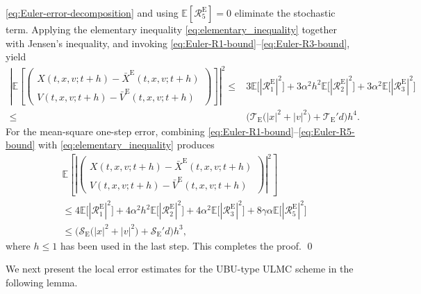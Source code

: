 \documentclass[12pt]{article}
\newenvironment{redtext}
  {\color{black}\ignorespaces}
  {\ignorespacesafterend}
\numberwithin{equation}{section}
\renewenvironment{proof}%
  {\begin{trivlist}%
   \item[]\ignorespaces}%
  {\qed\end{trivlist}}
\newcommand{\E}{\mathbb{E}}
\begin{document}
\begin{redtext}
\begin{proof}
\eqref{eq:Euler-error-decomposition} and using
$\E[\mathcal R_5^{\mathrm E}]=0$ eliminate the stochastic term.
Applying the elementary inequality
\eqref{eq:elementary_inequality} together with Jensen's inequality,
and invoking
\eqref{eq:Euler-R1-bound}--\eqref{eq:Euler-R3-bound}, yield
\begin{align}
\left|
\E
\left[
\left(
\begin{aligned}
X(t,x,v;t+h)-\bar X^{\mathrm E}(t,x,v;t+h)
\\
V(t,x,v;t+h)-\bar V^{\mathrm E}(t,x,v;t+h)
\end{aligned}
\right)
\right]
\right|^2
\leq  &
3\E\big[|\mathcal R_1^{\mathrm E}|^2\big]
+
3\alpha^2h^2\E\big[|\mathcal R_2^{\mathrm E}|^2\big]
+
3\alpha^2\E\big[|\mathcal R_3^{\mathrm E}|^2\big]
\nonumber\\
\leq & 
\Big(
\mathcal T_{\mathrm E}
\big(
|x|^2+|v|^2
\big)
+
\mathcal T_{\mathrm E}'d
\Big)h^4.
\label{eq:Euler-weak-square-bound}
\end{align}
For the mean-square one-step error, combining
\eqref{eq:Euler-R1-bound}--\eqref{eq:Euler-R5-bound} with
\eqref{eq:elementary_inequality} produces
\begin{align}
&
\E
\left[
\left|
\left(
\begin{aligned}
X(t,x,v;t+h)-\bar X^{\mathrm E}(t,x,v;t+h)
\\
V(t,x,v;t+h)-\bar V^{\mathrm E}(t,x,v;t+h)
\end{aligned}
\right)
\right|^2
\right]
\nonumber\\
&\leq
4\E\big[|\mathcal R_1^{\mathrm E}|^2\big]
+
4\alpha^2h^2\E\big[|\mathcal R_2^{\mathrm E}|^2\big]
+
4\alpha^2\E\big[|\mathcal R_3^{\mathrm E}|^2\big]
+
8\gamma\alpha\E\big[|\mathcal R_5^{\mathrm E}|^2\big]
\nonumber\\
&\leq
\Big(
\mathcal S_{\mathrm E}
\big(
|x|^2+|v|^2
\big)
+
\mathcal S_{\mathrm E}'d
\Big)h^3,
\end{align}
where $h\leq1$ has been used in the last step. This completes the proof.
\end{proof}

We next present the local error estimates for the UBU-type ULMC
scheme in the following lemma.

\end{redtext}

\end{document}
